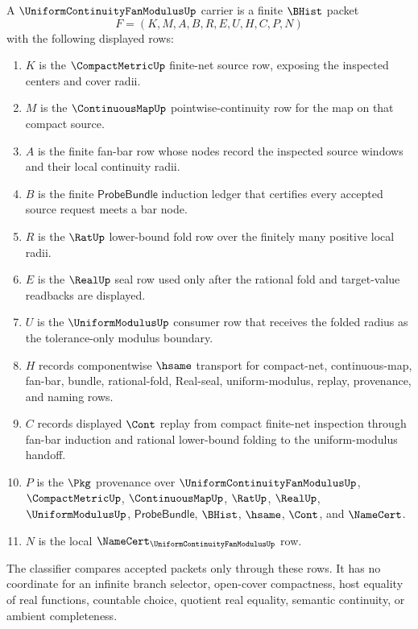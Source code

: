 \begin{definition}
\label{def:uniform-continuity-fan-modulus-carrier}
A $\UniformContinuityFanModulusUp$ carrier is a finite $\BHist$ packet
$$
F=(K,M,A,B,R,E,U,H,C,P,N)
$$
with the following displayed rows:
\begin{enumerate}
\item $K$ is the $\CompactMetricUp$ finite-net source row, exposing the inspected centers and cover radii.
\item $M$ is the $\ContinuousMapUp$ pointwise-continuity row for the map on that compact source.
\item $A$ is the finite fan-bar row whose nodes record the inspected source windows and their local continuity radii.
\item $B$ is the finite $\mathsf{ProbeBundle}$ induction ledger that certifies every accepted source request meets a bar node.
\item $R$ is the $\RatUp$ lower-bound fold row over the finitely many positive local radii.
\item $E$ is the $\RealUp$ seal row used only after the rational fold and target-value readbacks are displayed.
\item $U$ is the $\UniformModulusUp$ consumer row that receives the folded radius as the tolerance-only modulus boundary.
\item $H$ records componentwise $\hsame$ transport for compact-net, continuous-map, fan-bar, bundle, rational-fold, Real-seal, uniform-modulus, replay, provenance, and naming rows.
\item $C$ records displayed $\Cont$ replay from compact finite-net inspection through fan-bar induction and rational lower-bound folding to the uniform-modulus handoff.
\item $P$ is the $\Pkg$ provenance over $\UniformContinuityFanModulusUp$, $\CompactMetricUp$, $\ContinuousMapUp$, $\RatUp$, $\RealUp$, $\UniformModulusUp$, $\mathsf{ProbeBundle}$, $\BHist$, $\hsame$, $\Cont$, and $\NameCert$.
\item $N$ is the local $\NameCert_{\UniformContinuityFanModulusUp}$ row.
\end{enumerate}
The classifier compares accepted packets only through these rows. It has no coordinate for an infinite branch selector, open-cover compactness, host equality of real functions, countable choice, quotient real equality, semantic continuity, or ambient completeness.
\end{definition}

